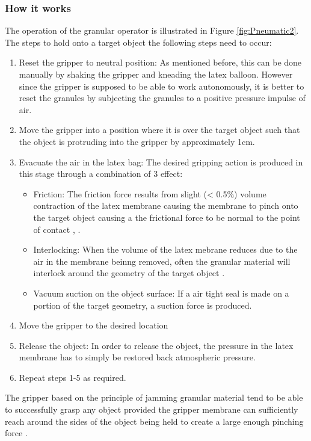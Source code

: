 \documentclass[11pt]{article}
\begin{document}
\subsubsection{How it works}
The operation of the granular operator is illustrated in Figure \ref{fig:Pneumatic2}. The steps to hold onto a target object the following steps need to occur:
\begin{enumerate}
\item Reset the gripper to neutral position: As mentioned before, this can be done manually by shaking the gripper and kneading the latex balloon. However since the gripper is supposed to be able to work autonomously, it is better to reset the granules by subjecting the granules to a positive pressure impulse of air.
\item Move the gripper into a position where it is over the target object such that the object is protruding into the gripper by approximately 1cm.
\item Evacuate the air in the latex bag: The desired gripping action is produced in this stage through a combination of 3 effect:
\begin{itemize}
\item Friction: The friction force results from slight (< 0.5\%) volume contraction of the latex membrane causing the membrane to pinch onto the target object causing a the frictional force to be normal to the point of contact \cite{amend2012positive}, \cite{brown2010universal}.
\item Interlocking: When the volume of the latex mebrane reduces due to the air in the membrane beinng removed, often the granular material will interlock around the geometry of the target object \cite{brown2010universal}.
\item Vacuum suction on the object surface: If a air tight seal is made on a portion of the target geometry, a suction force is produced.
\end{itemize} 
\item Move the gripper to the desired location
\item Release the object: In order to release the object, the pressure in the latex membrane has to simply be restored back atmospheric pressure.
\item Repeat steps 1-5 as required.  
\end{enumerate}
The gripper based on the principle of jamming granular material tend to be able to successfully grasp any object provided the gripper membrane can sufficiently reach around the sides of the object being held to create a large enough pinching force \cite{brown2010universal}. 
\end{document}
